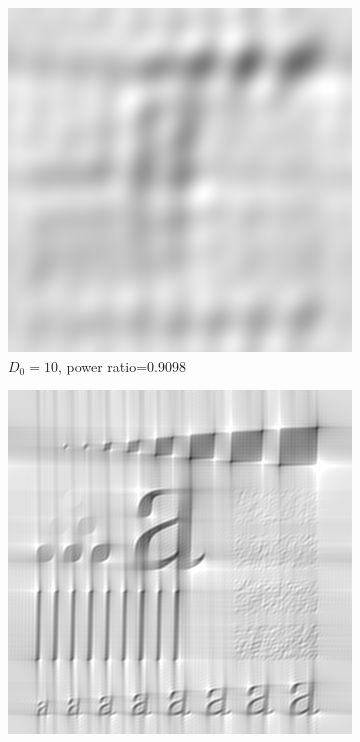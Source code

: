 \begin{figure}[h!]
	\centering
	\begin{subfigure}[b]{0.45\linewidth}
		\includegraphics[width=\linewidth]{myfigure/p3/ILPF_10.png}
		\caption{$D_0=10$, power ratio=0.9098}
		\label{fig:ILPF_10}
	\end{subfigure}
  	\begin{subfigure}[b]{0.45\linewidth}
		\includegraphics[width=\linewidth]{myfigure/p3/ILPF_100.png}

\end{subfigure}
\end{figure}
